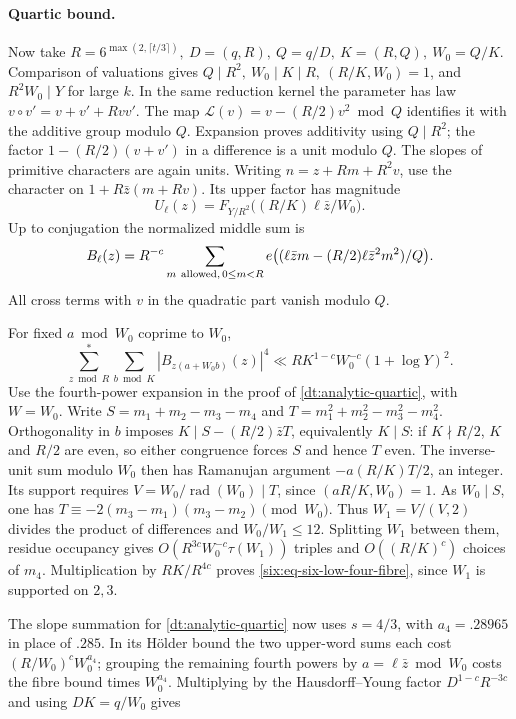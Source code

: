 \documentclass[11pt,a4paper]{article}
\theoremstyle{paperplain}
\numberwithin{equation}{section}
\begin{document}
\paragraph{Quartic bound.}
Now take \(R=6^{\max(2,\lceil t/3\rceil)},\ D=(q,R),\
Q=q/D,\ K=(R,Q),\ W_0=Q/K\).
Comparison of valuations gives \(Q\mid R^2,\ W_0\mid K\mid R,\
(R/K,W_0)=1\), and \(R^2W_0\mid Y\) for large \(k\).
In the same reduction kernel the parameter has law
\(v\circ v'=v+v'+Rvv'\). The map
\(\mathcal L(v)=v-(R/2)v^2\bmod Q\) identifies it with the additive
group modulo \(Q\). Expansion proves additivity using \(Q\mid R^2\);
the factor \(1-(R/2)(v+v')\) in a difference is a unit modulo \(Q\).
The slopes of primitive characters are again units.
Writing \(n=z+Rm+R^2v\), use the character on
\(1+R\bar z(m+Rv)\). Its upper factor has magnitude
\[
 U_\ell(z)=F_{Y/R^2}\big((R/K)\ell\bar z/W_0\big).
\]
Up to conjugation the normalized middle sum is
\[
 B_\ell(z)=R^{-c}\sum_{m\ {\rm allowed},\,0\le m<R}
 e\bigl((\ell\bar z m-(R/2)\ell\bar z^2 m^2)/Q\bigr).
\]
All cross terms with \(v\) in the quadratic part vanish modulo \(Q\).

For fixed \(a\bmod W_0\) coprime to \(W_0\),
\begin{equation}\label{six:eq-six-low-four-fibre}
 \sum_{z\bmod R}^{*}\sum_{b\bmod K}|B_{z(a+W_0 b)}(z)|^4
       \ll RK^{1-c}W_0^{-c}(1+\log Y)^2.
\end{equation}
Use the fourth-power expansion in the proof of \eqref{dt:analytic-quartic},
with $W=W_0$. Write $S=m_1+m_2-m_3-m_4$ and
$T=m_1^2+m_2^2-m_3^2-m_4^2$. Orthogonality in $b$ imposes
$K\mid S-(R/2)\bar zT$, equivalently $K\mid S$: if $K\nmid R/2$,
$K$ and $R/2$ are even, so either congruence forces $S$ and hence $T$
even. The inverse-unit sum modulo $W_0$ then has Ramanujan argument
$-a(R/K)T/2$, an integer. Its support requires
$V=W_0/\operatorname{rad}(W_0)\mid T$, since $(aR/K,W_0)=1$.
As $W_0\mid S$, one has $T\equiv-2(m_3-m_1)(m_3-m_2)\pmod{W_0}$.
Thus $W_1=V/(V,2)$ divides the product of differences and
$W_0/W_1\le12$. Splitting $W_1$ between them, residue occupancy
gives $O(R^{3c}W_0^{-c}\tau(W_1))$ triples and $O((R/K)^c)$
choices of $m_4$. Multiplication by $RK/R^{4c}$ proves
\eqref{six:eq-six-low-four-fibre}, since $W_1$ is supported on $2,3$.

The slope summation for \eqref{dt:analytic-quartic} now uses $s=4/3$,
with $a_4=.28965$ in place of $.285$. In its H\"older bound the two
upper-word sums each cost $(R/W_0)^c W_0^{a_4}$; grouping the remaining
fourth powers by $a=\ell\bar z\bmod W_0$ costs the fibre bound times
$W_0^{a_4}$. Multiplying by the Hausdorff--Young factor
$D^{1-c}R^{-3c}$ and using $DK=q/W_0$ gives
\end{document}
